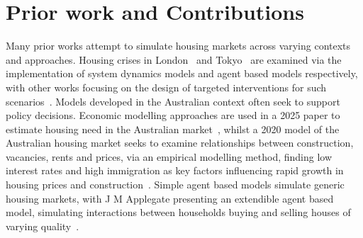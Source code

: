 \documentclass[11pt]{article}
\begin{document}

\section{Prior work and Contributions}
Many prior works attempt to simulate housing markets across varying 
contexts and approaches. Housing crises in London~\cite{kaveh2022london} and Tokyo~\cite{tamama2026housing} are 
examined via the implementation of system dynamics models and agent
based models respectively, with other works focusing on the 
design of targeted interventions for such scenarios~\cite{daniel2025data}.
Models developed in the Australian context often seek to support policy
decisions. Economic modelling approaches are used
in a 2025 paper to estimate housing need in the Australian market~\cite{daniel2025data},
whilst a 2020 model of the Australian housing market seeks to
examine relationships between construction, vacancies, rents and prices,
via an empirical modelling method,
finding low interest rates and high immigration as key factors influencing
rapid growth in housing prices and construction~\cite{saunders2020model}.
Simple agent based models simulate generic housing markets, with 
J M Applegate presenting an extendible agent based model, simulating
interactions between households buying and selling houses of varying quality~\cite{applegate2020general}.
\end{document}

